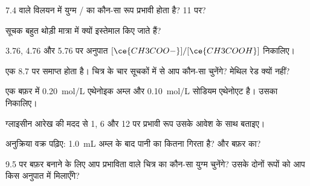 \begin{exercise}[$\star$]\label{exo:g12:buffers-predominance:4}
 7.4 वाले विलयन में युग्म / का कौन-सा रूप प्रभावी होता है?
 11 पर?
\end{exercise}

\begin{exercise}[$\star$]\label{exo:g12:buffers-predominance:5}
सूचक बहुत थोड़ी मात्रा में क्यों इस्तेमाल किए जाते हैं?
\end{exercise}

\begin{exercise}[$\star\star$]\label{exo:g12:buffers-predominance:6}
 3.76, 4.76 और 5.76 पर अनुपात $[\ce{CH3COO-}]/[\ce{CH3COOH}]$
निकालिए।
\end{exercise}

\begin{exercise}[$\star\star$]\label{exo:g12:buffers-predominance:7}
एक   8.7 पर समाप्त होता है। चित्र के चार सूचकों में से आप कौन-सा
चुनेंगे? मेथिल रेड क्यों नहीं?
\end{exercise}

\begin{exercise}[$\star\star$]\label{exo:g12:buffers-predominance:8}
एक बफ़र में \qty{0.20}{mol/L} एथेनोइक अम्ल और
\qty{0.10}{mol/L} सोडियम एथेनोएट है। उसका  निकालिए।
\end{exercise}

\begin{exercise}[$\star\star$]\label{exo:g12:buffers-predominance:9}
ग्लाइसीन आरेख की मदद से  1, 6 और 12 पर प्रभावी रूप
उसके आवेश के साथ बताइए।
\end{exercise}

\begin{exercise}[$\star\star$]\label{exo:g12:buffers-predominance:10}
अनुक्रिया वक्र पढ़िए: \qty{1.0}{mL} अम्ल के बाद पानी का  कितना
गिरता है? और बफ़र का?
\end{exercise}

\begin{exercise}[$\star\star$]\label{exo:g12:buffers-predominance:11}
 9.5 पर बफ़र बनाने के लिए आप प्रभाविता वाले चित्र का कौन-सा युग्म
चुनेंगे? उसके दोनों रूपों को आप किस अनुपात में मिलाएँगे?
\end{exercise}

